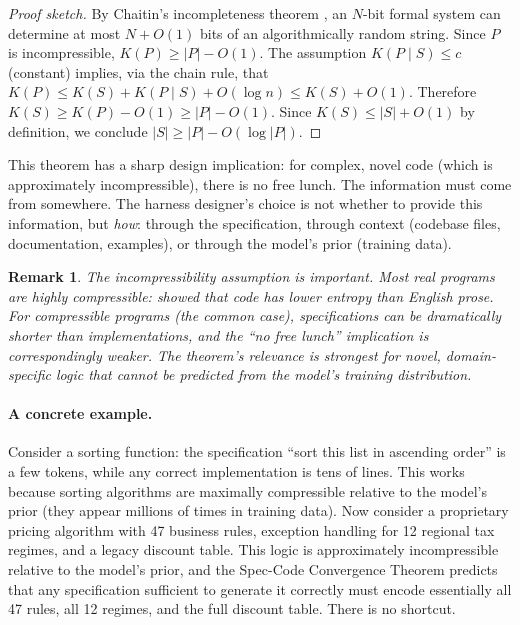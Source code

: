 \documentclass[11pt, a4paper, logo, copyright]{googledeepmind}
\newtheorem*{remark}{Remark}
\begin{document}
\begin{proof}[Proof sketch]
By Chaitin's incompleteness theorem \citep{chaitin1966length}, an $N$-bit formal system can determine at most $N + O(1)$ bits of an algorithmically random string. Since $P$ is incompressible, $K(P) \geq |P| - O(1)$. The assumption $K(P \mid S) \leq c$ (constant) implies, via the chain rule, that $K(P) \leq K(S) + K(P \mid S) + O(\log n) \leq K(S) + O(1)$. Therefore $K(S) \geq K(P) - O(1) \geq |P| - O(1)$. Since $K(S) \leq |S| + O(1)$ by definition, we conclude $|S| \geq |P| - O(\log |P|)$.
\end{proof}

This theorem has a sharp design implication: for complex, novel code (which is approximately incompressible), there is no free lunch. The information must come from somewhere. The harness designer's choice is not whether to provide this information, but \emph{how}: through the specification, through context (codebase files, documentation, examples), or through the model's prior (training data).

\begin{remark}
The incompressibility assumption is important. Most real programs are highly compressible: \citet{hindle2012naturalness} showed that code has lower entropy than English prose. For compressible programs (the common case), specifications can be dramatically shorter than implementations, and the ``no free lunch'' implication is correspondingly weaker. The theorem's relevance is strongest for novel, domain-specific logic that cannot be predicted from the model's training distribution.
\end{remark}

\paragraph{A concrete example.} Consider a sorting function: the specification ``sort this list in ascending order'' is a few tokens, while any correct implementation is tens of lines. This works because sorting algorithms are maximally compressible relative to the model's prior (they appear millions of times in training data). Now consider a proprietary pricing algorithm with 47 business rules, exception handling for 12 regional tax regimes, and a legacy discount table. This logic is approximately incompressible relative to the model's prior, and the Spec-Code Convergence Theorem predicts that any specification sufficient to generate it correctly must encode essentially all 47 rules, all 12 regimes, and the full discount table. There is no shortcut.
\end{document}

